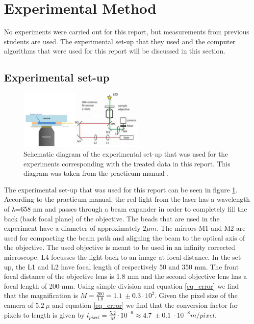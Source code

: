 \section{Experimental Method}

No experiments were carried out for this report, but measurements from previous students are used. The experimental set-up that they used and the computer algorithms that were used for this report will be discussed in this section.

\subsection{Experimental set-up}

\begin{figure}
    \centering
    \includegraphics[width=0.55\textwidth,keepaspectratio]{figures/setup.png}
    \caption{Schematic diagram of the experimental set-up that was used for the experiments corresponding with the treated data in this report. This diagram was taken from the practicum manual \cite{practicum_manual}.}
    \label{fig_setup}
\end{figure}


The experimental set-up that was used for this report can be seen in figure \ref{fig_setup}. 
According to the practicum manual, the red light from the laser has a wavelength of λ=658 nm and passes through a beam expander in order to completely fill the back (back focal plane) of the objective. 
The beads that are used in the experiment have a diameter of approximately $ 2 \mu m$. 
The mirrors M1 and M2 are used for compacting the beam path and aligning the beam to the optical axis of the objective. 
The used objective is meant to be used in an infinity corrected microscope. 
L4 focusses the light back to an image at focal distance. 
In the set-up, the L1 and L2 have focal length of respectively 50 and 350 mm. The front focal distance of the objective lens is 1.8 mm and the second objective lens has a focal length of 200 mm. Using simple division and equation \ref{eq_error} we find that the magnification is  $ M = \frac{200}{1.8} = 1.1  \: \pm 0.3 \cdot 10^2$. Given the pixel size of the camera of $ 5.2 \: \mu $  and equation  \ref{eq_error} we find that the conversion factor for pixels to length is given by $l_{pixel} = \frac{5.2}{M} \cdot 10^{-6} \approx 4.7 \; \pm 0.1 \; \cdot 10^{-8} m/pixel$.

